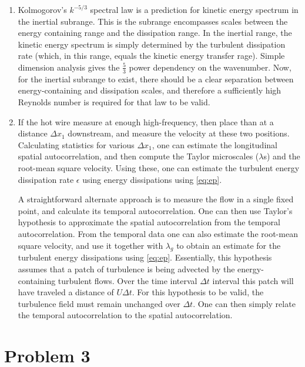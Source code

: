 \documentclass[11pt]{article}
\begin{document}
\begin{enumerate}[label=(\alph*)]

        \item Kolmogorov's $k^{-5/3}$ spectral law is a prediction for kinetic energy spectrum in the inertial
             subrange. This is the subrange encompasses scales between the energy containing range and the 
              dissipation range. In the inertial range, the kinetic energy spectrum is simply determined by the
               turbulent dissipation rate (which, in this range, equals the kinetic energy transfer rage). Simple dimension analysis
                gives the $\tfrac{5}{3}$ power dependency on the wavenumber. Now, for the inertial subrange to exist, 
                 there should be a clear separation between energy-containing and dissipation scales, and therefore
                  a sufficiently high Reynolds number is required for that law to be valid.
              \item If the hot wire measure at enough high-frequency, then place than at a distance $\Delta x_1$ downstream, and measure the velocity at these two positions. Calculating statistics for various $\Delta x_1$, one can estimate the longitudinal spatial autocorrelation, and then compute the Taylor microscales ($\lambda$s) and the root-mean square velocity. Using these, one can estimate the turbulent energy dissipation rate $\epsilon$ using energy dissipations using \ref{eq:ep}.
                  
                  A straightforward alternate approach is to measure the flow in a single fixed point, and calculate its temporal autocorrelation. One can then use Taylor's hypothesis to approximate the spatial autocorrelation from the temporal autocorrelation. From the temporal data one can also estimate the root-mean square velocity, and use it together with $\lambda_g$ to obtain an estimate for the turbulent energy dissipations using \ref{eq:ep}. Essentially, this hypothesis assumes that a patch of turbulence is being advected by the energy-containing turbulent flows. Over the time interval $\Delta t$ interval this patch will have traveled a distance of $U \Delta t$. For this hypothesis to be valid, the turbulence field must remain unchanged over $\Delta t$. One can then simply relate the temporal autocorrelation to the spatial autocorrelation.


\end{enumerate}

\section*{Problem 3}


\end{document}
